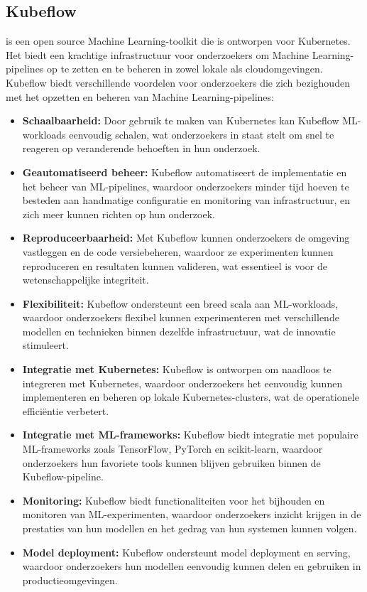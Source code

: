 \subsection{Kubeflow}
\textcite{Kubeflow2021} is een open source Machine Learning-toolkit die is ontworpen voor Kubernetes. Het biedt een krachtige infrastructuur voor onderzoekers om Machine Learning-pipelines op te zetten en te beheren in zowel lokale als cloudomgevingen.
Kubeflow biedt verschillende voordelen voor onderzoekers die zich bezighouden met het opzetten en beheren van Machine Learning-pipelines:
\begin{itemize}
    \item \textbf{Schaalbaarheid:} Door gebruik te maken van Kubernetes kan Kubeflow ML-workloads eenvoudig schalen, wat onderzoekers in staat stelt om snel te reageren op veranderende behoeften in hun onderzoek.
    \item \textbf{Geautomatiseerd beheer:} Kubeflow automatiseert de implementatie en het beheer van ML-pipelines, waardoor onderzoekers minder tijd hoeven te besteden aan handmatige configuratie en monitoring van infrastructuur, en zich meer kunnen richten op hun onderzoek.
    \item \textbf{Reproduceerbaarheid:} Met Kubeflow kunnen onderzoekers de omgeving vastleggen en de code versiebeheren, waardoor ze experimenten kunnen reproduceren en resultaten kunnen valideren, wat essentieel is voor de wetenschappelijke integriteit.
    \item \textbf{Flexibiliteit:} Kubeflow ondersteunt een breed scala aan ML-workloads, waardoor onderzoekers flexibel kunnen experimenteren met verschillende modellen en technieken binnen dezelfde infrastructuur, wat de innovatie stimuleert.
    \item \textbf{Integratie met Kubernetes:} Kubeflow is ontworpen om naadloos te integreren met Kubernetes, waardoor onderzoekers het eenvoudig kunnen implementeren en beheren op lokale Kubernetes-clusters, wat de operationele efficiëntie verbetert.
    \item \textbf{Integratie met ML-frameworks:} Kubeflow biedt integratie met populaire ML-frameworks zoals TensorFlow, PyTorch en scikit-learn, waardoor onderzoekers hun favoriete tools kunnen blijven gebruiken binnen de Kubeflow-pipeline.
    \item \textbf{Monitoring:} Kubeflow biedt functionaliteiten voor het bijhouden en monitoren van ML-experimenten, waardoor onderzoekers inzicht krijgen in de prestaties van hun modellen en het gedrag van hun systemen kunnen volgen.
    \item \textbf{Model deployment:} Kubeflow ondersteunt model deployment en serving, waardoor onderzoekers hun modellen eenvoudig kunnen delen en gebruiken in productieomgevingen.
\end{itemize}
